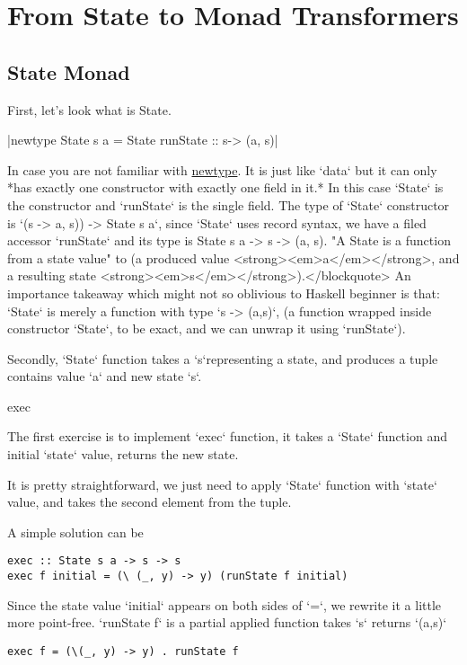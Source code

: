 \chapter{From State to Monad Transformers}

\section{State Monad}

First, let's look what is State.

|newtype State s a = State { runState :: s-> (a, s)}|


In case you are not familiar with \href{https://wiki.haskell.org/Newtype}{newtype}.
It is just like `data` but it can only *has exactly one constructor with exactly one field in it.* In this case `State` is the constructor and `runState` is the single field. The type of `State` constructor is `(s ->  a, s)) -> State s a`, since `State` uses record syntax, we have a filed accessor `runState` and its type is State s a -> s -> (a, s).
"A State is a function from a state value" to (a produced value <strong><em>a</em></strong>, and a resulting state <strong><em>s</em></strong>).</blockquote>
An importance takeaway which might not so oblivious to Haskell beginner is that: `State` is merely a function with type `s -> (a,s)`, (a function wrapped inside constructor `State`, to be exact, and we can unwrap it using `runState`).

Secondly, `State` function takes a `s`representing a state, and produces a tuple contains value `a` and new state `s`.

 exec

The first exercise is to implement `exec` function, it takes a `State` function and initial `state` value, returns the new state.

It is pretty straightforward, we just need to apply `State` function with `state` value, and takes the second  element from the tuple.

A simple solution can be

\begin{verbatim}
exec :: State s a -> s -> s
exec f initial = (\ (_, y) -> y) (runState f initial)
\end{verbatim}

Since the state value `initial` appears on both sides of `=`, we rewrite it a little more point-free. `runState f` is a partial applied function takes `s` returns `(a,s)`

\begin{verbatim}
exec f = (\(_, y) -> y) . runState f
\end{verbatim}

